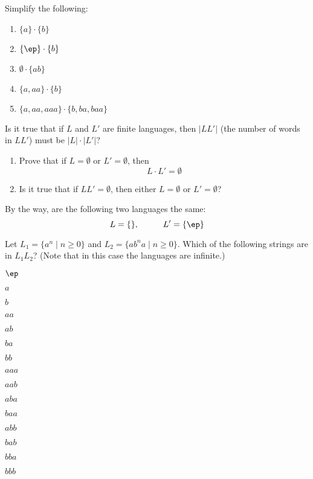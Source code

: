 \newpage
\begin{ex} Simplify the following:
  \begin{enumerate}
  \item $\{a\} \cdot \{b\}$
  \item $\{\ep\} \cdot \{b\}$
  \item $\emptyset \cdot \{ab\}$
  \item $\{a, aa\} \cdot \{b\}$
  \item $\{a, aa, aaa\} \cdot \{b, ba, baa\}$
  \end{enumerate}
\end{ex}

\newpage
\begin{ex}
  Is it true that if $L$ and $L'$ are finite languages,
  then $|LL'|$ (the number of words in $LL'$)
  must be $|L| \cdot |L'|$?
\end{ex}


\newpage
\begin{ex}
  \begin{enumerate}

  \item
    Prove that 
    if $L = \emptyset$ or $L' = \emptyset$, then
    \[
    L \cdot L' = \emptyset
    \]
    
  \item
    Is it true that if $LL' = \emptyset$, then either $L = \emptyset$
    or $L' = \emptyset$?
    
  \end{enumerate}


  By the way, are the following two languages the same:
  \[
  L = \{\}, \hspace{1cm}
  L' = \{\ep\}
  \]
  
\end{ex}

\newpage
\begin{ex}
Let $L_1 = \{a^n \mid n \geq 0\}$ and $L_2 = \{ab^na \mid n \geq 0\}$.
Which of the following strings are in $L_1 L_2$?
(Note that in this case the languages are infinite.)
\begin{tightlist}
\item $\ep$
\item $a$
\item $b$
\item $aa$
\item $ab$
\item $ba$
\item $bb$
\item $aaa$
\item $aab$
\item $aba$
\item $baa$
\item $abb$
\item $bab$
\item $bba$
\item $bbb$
\end{tightlist}
\end{ex}


